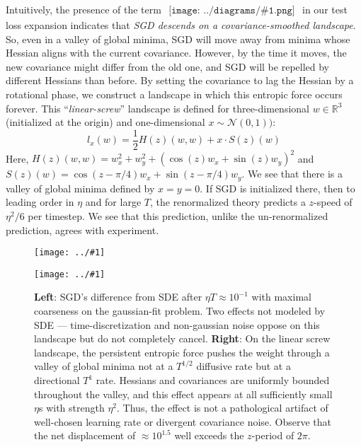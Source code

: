 \documentclass{article}
\newcommand{\Nn}{\mathcal{N}}
\newcommand{\RR}{\mathbb{R}}
\newcommand{\plotmoo}[3]{
    \texttt{[image: ../\#1]}
}
\newcommand{\sdia}[1]{\begin{gathered}\texttt{[image: ../diagrams/\#1.png]}\end{gathered}}
\begin{document}
        Intuitively, the presence of the term
        $
            \sdia{c(01-2-3)(02-12-23)}
        $
        in our test loss expansion indicates that 
        \emph{SGD descends on a covariance-smoothed landscape}.
        So, even in a valley of global minima, SGD will move away from minima
        whose Hessian aligns with the current covariance.  However, by the time
        it moves, the new covariance might differ from the old one, and SGD will
        be repelled by different Hessians than before.  By setting the
        covariance to lag the Hessian by a rotational phase, we construct
        a landscape in which this entropic force occurs forever. 
        This ``\emph{linear-screw}'' landscape is defined for
        three-dimensional $w\in \RR^3$ (initialized at the origin) and
        one-dimensional $x \sim \Nn(0, 1))$:
        $$
            l_x(w) = \frac{1}{2} H(z)(w, w) + x \cdot S(z)(w)  
        $$
        Here, $H(z)(w, w) = w_x^2 + w_y^2 + (\cos(z) w_x + \sin(z) w_y)^2$
        and   $S(z)(w)    = \cos(z-\pi/4) w_x + \sin(z-\pi/4) w_y$.
        We see that there is a valley of global minima defined by $x=y=0$. 
        If SGD is initialized there, then to leading order in $\eta$ and for
        large $T$, the renormalized theory predicts a $z$-speed of $\eta^2/6$ 
        per timestep.  We see that this prediction, unlike the
        un-renormalized prediction, agrees with experiment.

        \begin{figure}[h!]
            \centering
            \plotmoo{plots/vs-sde}{0.48\columnwidth}{4.0cm}
            \plotmoo{plots/thermo-linear-screw}{0.48\columnwidth}{4.0cm}
            \caption{
                {\bf Left}: SGD's difference from SDE after $\eta T \approx
                10^{-1}$ with maximal coarseness on the gaussian-fit problem.  
                Two effects not modeled by SDE --- time-discretization and
                non-gaussian noise oppose on this landscape but do not
                completely cancel. 
                {\bf Right}: On the linear screw landscape, the persistent
                entropic force pushes the weight through a valley of global
                minima not at a $T^{1/2}$ diffusive rate but at a directional
                $T^1$ rate.  Hessians and covariances  are uniformly bounded
                throughout the valley, and this effect appears at all
                sufficiently small $\eta$s with strength $\eta^2$.  Thus, the
                effect is not a pathological artifact of well-chosen learning
                rate or divergent covariance noise.  Observe that the net
                displacement of $\approx 10^{1.5}$ well exceeds the $z$-period
                of $2\pi$. 
            }
            \label{fig:thermo}
        \end{figure}
\end{document}
